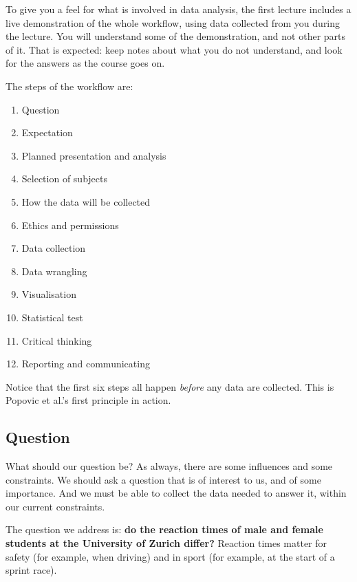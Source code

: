 \documentclass[
  letterpaper,
  8pt,
  a4paper]{book}
\providecommand{\tightlist}{%
  \setlength{\itemsep}{0pt}\setlength{\parskip}{0pt}}
\begin{document}

To give you a feel for what is involved in data analysis, the first
lecture includes a live demonstration of the whole workflow, using data
collected from you during the lecture. You will understand some of the
demonstration, and not other parts of it. That is expected: keep notes
about what you do not understand, and look for the answers as the course
goes on.

The steps of the workflow are:

\begin{enumerate}
\def\labelenumi{\arabic{enumi}.}
\tightlist
\item
  Question
\item
  Expectation
\item
  Planned presentation and analysis
\item
  Selection of subjects
\item
  How the data will be collected
\item
  Ethics and permissions
\item
  Data collection
\item
  Data wrangling
\item
  Visualisation
\item
  Statistical test
\item
  Critical thinking
\item
  Reporting and communicating
\end{enumerate}

Notice that the first six steps all happen \emph{before} any data are
collected. This is Popovic et al.'s first principle in action.

\subsection*{Question}\label{question}

What should our question be? As always, there are some influences and
some constraints. We should ask a question that is of interest to us,
and of some importance. And we must be able to collect the data needed
to answer it, within our current constraints.

The question we address is: \textbf{do the reaction times of male and
female students at the University of Zurich differ?} Reaction times
matter for safety (for example, when driving) and in sport (for example,
at the start of a sprint race).
\end{document}
